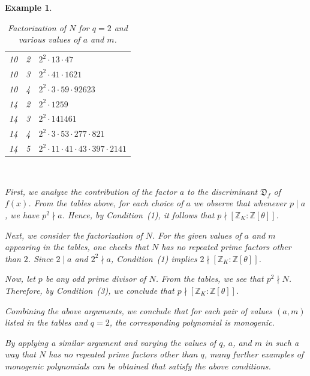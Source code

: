 \documentclass[table]{amsart}
\newtheorem{example}[theorem]{Example}
\newcommand{\D}{\mathfrak{D}}
\numberwithin{equation}{section}
\begin{document}
\begin{example}
\begin{table}[h]
\begin{minipage}{0.48\textwidth}
\begin{tabular}{|c|c|l|}
10 & 2 & $ 2^2 \cdot 13 \cdot 47$ \\
10 & 3 & $ 2^2 \cdot 41 \cdot 1621$ \\
10 & 4 & $ 2^2 \cdot 3 \cdot 59 \cdot 92623$ \\
\hline

14 & 2 & $ 2^2 \cdot 1259$ \\
14 & 3 & $ 2^2 \cdot 141461$ \\
14 & 4 & $ 2^2 \cdot 3 \cdot 53 \cdot 277 \cdot 821$ \\
14 & 5 & $2^2 \cdot 11 \cdot 41 \cdot 43 \cdot 397 \cdot 2141$ \\
\hline
\end{tabular}
\end{minipage}
\\[2mm]
\caption{Factorization of $N$ for $q=2$ and various values of $a$ and $m$.}
\end{table}
First, we analyze the contribution of the factor $a$ to the discriminant 
$\D_f$ of $f(x)$. From the tables above, for each choice of $a$ we observe that whenever $p \mid a$, we have $p^2 \nmid a$. Hence, by Condition~(1), it follows that 
$p \nmid [\mathbb{Z}_K : \mathbb{Z}[\theta]]$.

Next, we consider the factorization of $N$. For the given values of $a$ and $m$ appearing in the tables, one checks that $N$ has no repeated prime factors other than $2$. Since $2 \mid  a$ and $2^2 \nmid a$, Condition~(1) implies 
$2 \nmid [\mathbb{Z}_K : \mathbb{Z}[\theta]]$.

Now, let $p$ be any odd prime divisor of $N$. From the tables, we see that 
$p^2 \nmid N$. Therefore, by Condition~(3), we conclude that 
$p \nmid [\mathbb{Z}_K : \mathbb{Z}[\theta]]$.

Combining the above arguments, we conclude that for each pair of values $(a,m)$ listed in the tables and $q=2$, the corresponding polynomial is monogenic.

By applying a similar argument and varying the values of $q$, $a$, and $m$ in such a way that $N$ has no repeated prime factors other than $q$, many further examples of monogenic polynomials can be obtained that satisfy the above conditions.
\end{example}
\end{document}
